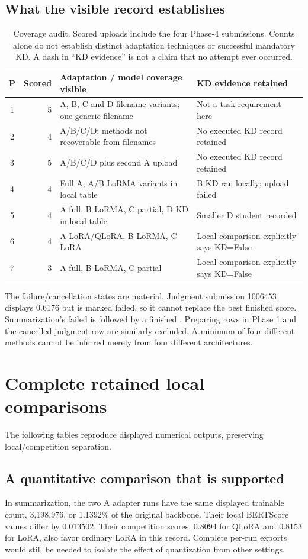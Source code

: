 \subsection{What the visible record establishes}
\begin{table}[H]\centering\small
\caption{Coverage audit. Scored uploads include the four Phase-4 submissions. Counts alone do not establish distinct adaptation techniques or
successful mandatory KD. A dash in ``KD evidence'' is not a claim that no attempt ever occurred.}
\begin{tabularx}{\textwidth}{crXX}
\toprule P & Scored & Adaptation / model coverage visible & KD evidence retained\\\midrule
1 & 5 & A, B, C and D filename variants; one generic filename & Not a task requirement here\\
2 & 4 & A/B/C/D; methods not recoverable from filenames & No executed KD record retained\\
3 & 5 & A/B/C/D plus second A upload & No executed KD record retained\\
4 & 4 & Full A; A/B LoRMA variants in local table & B KD ran locally; upload failed\\
5 & 4 & A full, B LoRMA, C partial, D KD in local table & Smaller D student recorded\\
6 & 4 & A LoRA/QLoRA, B LoRMA, C LoRA & Local comparison explicitly says KD=False\\
7 & 3 & A full, B LoRMA, C partial & Local comparison explicitly says KD=False\\\bottomrule
\end{tabularx}\end{table}
The failure/cancellation states are material. Judgment submission 1006453 displays 0.6176 but is marked
failed, so it cannot replace the best finished score. Summarization's failed  is followed
by a finished . Preparing rows in Phase 1 and the cancelled judgment row are similarly
excluded. A minimum of four different methods cannot be inferred merely from four different architectures.

\section{Complete retained local comparisons}
\label{app:localresults}
The following tables reproduce displayed numerical outputs, preserving local/competition separation.


\subsection{A quantitative comparison that is supported}
In summarization, the two A adapter runs have the same displayed trainable count, 3,198,976, or 1.1392\%
of the original backbone. Their local BERTScore values differ by 0.013502. Their competition scores, 0.8094 for QLoRA
and 0.8153 for LoRA, also favor ordinary LoRA in this record. Complete per-run exports would
still be needed to isolate the effect of quantization from other settings.

